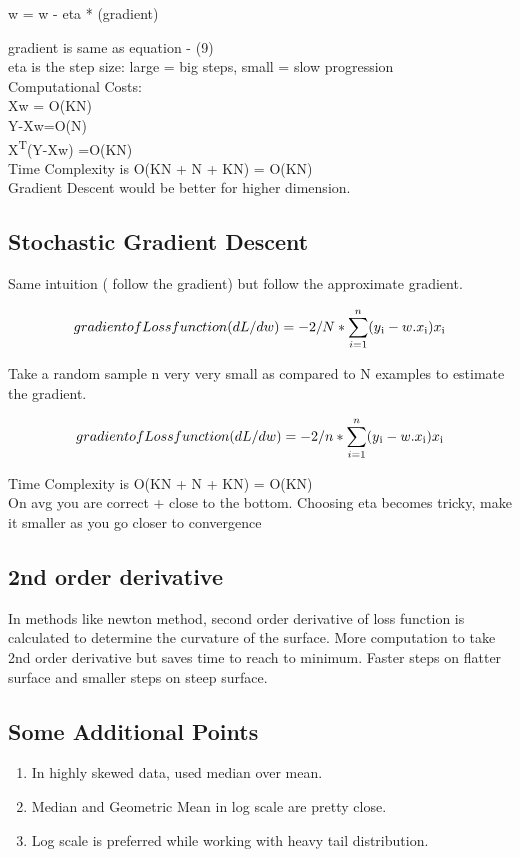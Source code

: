 w = w - eta * (gradient)

gradient is same as equation - (9)\\

eta is the step size: large = big steps, small = slow progression \\
Computational Costs:\\
Xw = O(KN)\\
Y-Xw=O(N)\\
X\textsuperscript{T}(Y-Xw) =O(KN)\\
Time Complexity is O(KN + N + KN) = O(KN)\\

Gradient Descent would be better for higher dimension.

\subsection{Stochastic Gradient Descent}

Same intuition ( follow the gradient) but follow the approximate gradient.

\begin{equation}
	gradient of Loss function (dL/dw)= -2/ N *  \sum\limits_{i=1}^n (y\textsubscript{i} - w.x\textsubscript{i})x\textsubscript{i}
\end{equation}

Take a random sample n very very small as compared to N examples to estimate the gradient.

\begin{equation}
	gradient of Loss function (dL/dw)= -2/ n *  \sum\limits_{i=1}^n (y\textsubscript{i} - w.x\textsubscript{i})x\textsubscript{i}
\end{equation}

Time Complexity is O(KN + N + KN) = O(KN) \\

On avg you are correct + close to the bottom. Choosing eta becomes tricky, make it smaller as you go closer to convergence

\subsection{2nd order derivative}

In methods like newton method,  second order derivative of loss function is calculated to determine the curvature of the surface. More computation to take 2nd order derivative but saves time to reach to minimum. Faster steps on flatter surface and smaller steps on steep surface.

\subsection{Some Additional Points}

\begin{enumerate}
  \item In highly skewed data, used median over mean.
  \item Median and Geometric Mean in log scale are pretty close.
  \item Log scale is preferred while working with heavy tail distribution.
\end{enumerate}


















